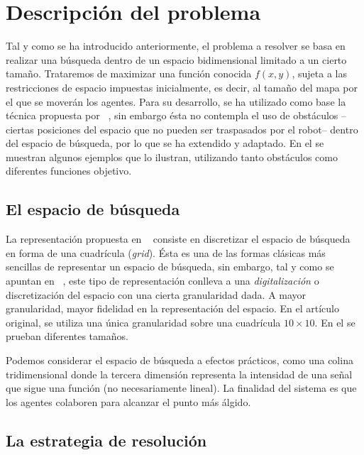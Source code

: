 
    \section{Descripción del problema}
    \label{sec:descripcion}
    Tal y como se ha introducido anteriormente, el problema a resolver se basa en realizar una búsqueda dentro de un espacio bidimensional limitado a un cierto tamaño. Trataremos de maximizar una función conocida $f(x,y)$, sujeta a las restricciones de espacio impuestas inicialmente, es decir, al tamaño del mapa por el que se moverán los agentes.
    Para su desarrollo, se ha utilizado como base la técnica propuesta por ~\cite{initialPaper}, sin embargo ésta no contempla el uso de obstáculos --ciertas posiciones del espacio que no pueden ser traspasados por el robot-- dentro del espacio de búsqueda, por lo que se ha extendido y adaptado.
    En el  se muestran algunos ejemplos que lo ilustran, utilizando tanto obstáculos como diferentes funciones objetivo. %


    \subsection{El espacio de búsqueda}
    \label{sec:espacio}

    La representación propuesta en ~\cite{initialPaper} consiste en discretizar el espacio de búsqueda en forma de una cuadrícula (\textit{grid}). Ésta es una de las formas clásicas más sencillas de representar un espacio de búsqueda, sin embargo, tal y como se apuntan en ~\cite{AIRobotics}, este tipo de representación conlleva a una \textit{digitalización} o discretización del espacio con una cierta granularidad dada. A mayor granularidad, mayor fidelidad en la representación del espacio. En el artículo original, se utiliza una única granularidad sobre una cuadrícula $10 \times 10$. En el  se prueban diferentes tamaños. %

    Podemos considerar el espacio de búsqueda a efectos prácticos, como una colina tridimensional donde la tercera dimensión representa la intensidad de una señal que sigue una función (no necesariamente lineal). La finalidad del sistema es que los agentes colaboren para alcanzar el punto más álgido.

    \subsection{La estrategia de resolución}

